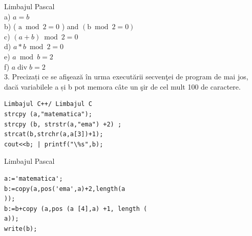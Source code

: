 \documentclass[10pt]{article}
\begin{document}
Limbajul Pascal\\
a) $a=b$\\
b) ( $\mathrm{a} \bmod 2=0$ ) and $(\mathrm{b} \bmod 2=0)$\\
c) $(a+b) \bmod 2=0$\\
d) $a * b \bmod 2=0$\\
e) $a \bmod b=2$\\
f) $a \operatorname{div} b=2$\\
3. Precizați ce se afişează în urma executării secvenţei de program de mai jos, dacă variabilele a și b pot memora câte un şir de cel mult 100 de caractere.

\begin{verbatim}
Limbajul C++/ Limbajul C
strcpy (a,"matematica");
strcpy (b, strstr(a,"ema") +2) ;
strcat(b,strchr(a,a[3])+1);
cout<<b; | printf("\%s",b);
\end{verbatim}

Limbajul Pascal

\begin{verbatim}
a:='matematica';
b:=copy(a,pos('ema',a)+2,length(a
));
b:=b+copy (a,pos (a [4],a) +1, length (
a));
write(b);
\end{verbatim}
\end{document}
